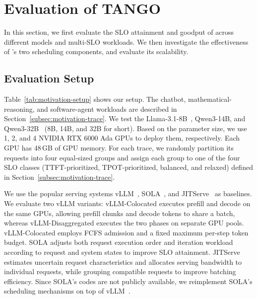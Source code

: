 \section{Evaluation of TANGO}
\label{sec:evaluation-of-tango}

In this section, we first evaluate the SLO attainment and goodput of \tango{} across different models and multi-SLO workloads.
We then investigate the effectiveness of \tango{}'s two scheduling components, 
and evaluate its scalability.

\subsection{Evaluation Setup}
\label{subsec:evaluation-setup}

Table~\ref{tab:motivation-setup} shows our setup.
The chatbot, mathematical-reasoning, and software-agent workloads are described in Section~\ref{subsec:motivation-trace}.
We test the Llama-3.1-8B~\cite{grattafiori2024llama3}, Qwen3-14B, and Qwen3-32B~\cite{yang2025qwen3} (8B, 14B, and 32B for short).
Based on the parameter size, we use 1, 2, and 4 NVIDIA RTX 6000 Ada GPUs to deploy them, respectively.
Each GPU has 48\,GB of GPU memory.
For each trace, we randomly partition its requests into four equal-sized groups and assign each group to one of the four SLO classes (TTFT-prioritized, TPOT-prioritized, balanced, and relaxed) defined in Section~\ref{subsec:motivation-trace}.

We use the popular serving systems vLLM~\cite{kwon2023vllm}, SOLA~\cite{hong2025sola}, and JITServe~\cite{zhang2026jitserve} as baselines.
We evaluate two vLLM variants: vLLM-Colocated executes prefill and decode on the same GPUs, allowing prefill chunks and decode tokens to share a batch, whereas vLLM-Disaggregated executes the two phases on separate GPU pools.
vLLM-Colocated employs FCFS admission and a fixed maximum per-step token budget.
SOLA adjusts both request execution order and iteration workload according to request and system states to improve SLO attainment.
JITServe estimates uncertain request characteristics and allocates serving bandwidth to individual requests, while grouping compatible requests to improve batching efficiency.
Since SOLA's codes are not publicly available, we reimplement SOLA's scheduling mechanisms on top of vLLM~\cite{vllm2026optimization}.%


